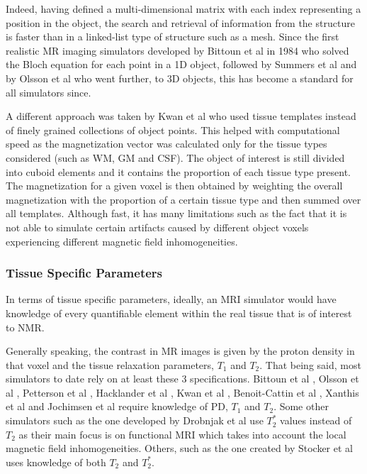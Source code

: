 Indeed, having defined a multi-dimensional matrix with each index representing a position in the object, the search and retrieval of information from the structure is faster than in a linked-list type of structure such as a mesh. Since the first realistic MR imaging simulators developed by Bittoun et al in 1984 \cite{Bittoun1984} who solved the Bloch equation for each point in a 1D object, followed by Summers et al \cite{Summers1986} and by Olsson et al \cite{Olsson1995} who went further, to 3D objects, this has become a standard for all simulators since. 

A different approach was taken by Kwan et al \cite{Kwan1999} who used tissue templates instead of finely grained collections of object points. This helped with computational speed as the magnetization vector was calculated only for the tissue types considered (such as WM, GM and CSF). The object of interest is still divided into cuboid elements and it contains the proportion of each tissue type present. The magnetization for a given voxel is then obtained by weighting the overall magnetization with the proportion of a certain tissue type and then summed over all templates. Although fast, it has many limitations such as the fact that it is not able to simulate certain artifacts caused by different object voxels experiencing different magnetic field inhomogeneities.

\subsubsection{Tissue Specific Parameters}
In terms of tissue specific parameters, ideally, an MRI simulator would have knowledge of every quantifiable element within the real tissue that is of interest to NMR. 

Generally speaking, the contrast in MR images is given by the proton density in that voxel and the tissue relaxation parameters, $T_1$ and $T_2$. That being said, most simulators to date rely on at least these 3 specifications. Bittoun et al \cite{Bittoun1984}, Olsson et al \cite{Olsson1995}, Petterson et al \cite{Petersson1993}, Hacklander et al \cite{Hacklander2005}, Kwan et al \cite{Kwan1999}, Benoit-Cattin et al \cite{Benoit-Cattin2005}, Xanthis et al \cite{Xanthis2014} and Jochimsen et al \cite{Jochimsen2004} require knowledge of PD, $T_1$ and $T_2$. Some other simulators such as the one developed by Drobnjak et al \cite{Drobnjak2006} use $T_2^*$ values instead of $T_2$ as their main focus is on functional MRI which takes into account the local magnetic field inhomogeneities. Others, such as the one created by Stocker et al \cite{Stocker2010} uses knowledge of both $T_2$ and $T_2^*$.

